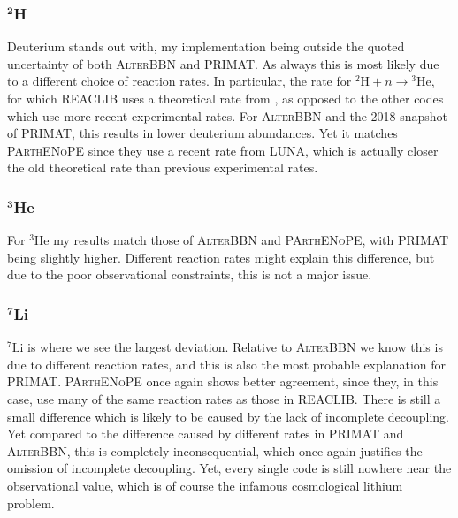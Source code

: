 \subsubsection{$^\textbf{2}$H}
Deuterium stands out with, my implementation being outside the quoted uncertainty of both \textsc{AlterBBN} and PRIMAT. As always this is most likely due to a different choice of reaction rates. In particular, the rate for ${}^2\text{H}+n\rightarrow {}^3\text{He}$, for which REACLIB uses a theoretical rate from \textcite{Reaclibdphe3_2004}, as opposed to the other codes which use more recent experimental rates. For \textsc{AlterBBN} and the 2018 snapshot of PRIMAT, this results in lower deuterium abundances. Yet it matches \textsc{PArthENoPE} since they use a recent rate from LUNA, which is actually closer the old theoretical rate than previous experimental rates\cite{Luna_impact_Pisanti_2021}. 

\subsubsection{$^\textbf{3}$He}
For $^{3}$He my results match those of \textsc{AlterBBN} and \textsc{PArthENoPE}, with PRIMAT being slightly higher. Different reaction rates might explain this difference, but due to the poor observational constraints, this is not a major issue. 

\subsubsection{$^\textbf{7}$Li}
${}^7\text{Li}$ is where we see the largest deviation. Relative to \textsc{AlterBBN} we know this is due to different reaction rates, and this is also the most probable explanation for PRIMAT. \textsc{PArthENoPE} once again shows better agreement, since they, in this case, use many of the same reaction rates as those in REACLIB. There is still a small difference which is likely to be caused by the lack of incomplete decoupling. Yet compared to the difference caused by different rates in PRIMAT and \textsc{AlterBBN}, this is completely inconsequential, which once again justifies the omission of incomplete decoupling. Yet, every single code is still nowhere near the observational value, which is of course the infamous cosmological lithium problem.


